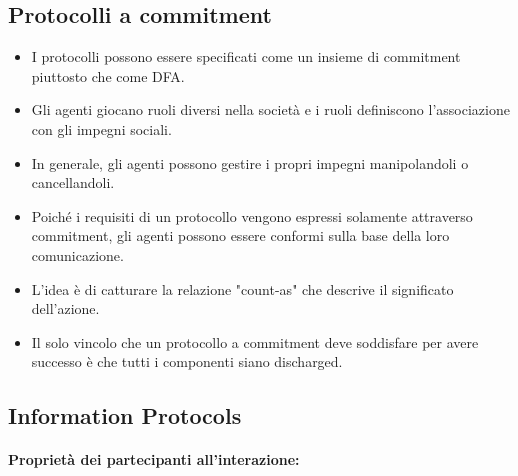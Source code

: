 \subsection{Protocolli a commitment}


\begin{itemize}
  \item I protocolli possono essere specificati come un insieme di commitment piuttosto che come DFA. 
  \item Gli agenti giocano ruoli diversi nella società e i ruoli definiscono l'associazione con gli impegni sociali. 
  \item In generale, gli agenti possono gestire i propri impegni manipolandoli o cancellandoli. 
  \item Poiché i requisiti di un protocollo vengono espressi solamente attraverso commitment, gli agenti possono essere conformi sulla base della loro comunicazione. 
 \item L'idea è di catturare la relazione "count-as" che descrive il significato dell'azione. 
    \item Il solo vincolo che un protocollo a commitment deve soddisfare per avere successo è che tutti i componenti siano discharged. 

\end{itemize}



\subsection{Information Protocols}


\paragraph{Proprietà dei partecipanti all'interazione:}

